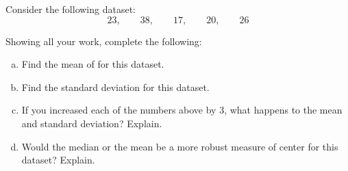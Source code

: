 \documentclass[11pt,letterpaper]{article}
\begin{document}
\newpage



 Consider the following dataset:
	\[
	23, \qquad 38, \qquad 17, \qquad 20, \qquad 26
	\]

Showing all your work, complete the following: 
	\begin{enumerate}[(a)]
	\item Find the mean of for this dataset. 
	\item Find the standard deviation for this dataset. 
	\item If you increased each of the numbers above by 3, what happens to the mean and standard deviation? Explain. 
	\item Would the median or the mean be a more robust measure of center for this dataset? Explain. 
	\end{enumerate} \pspace
\end{document}
